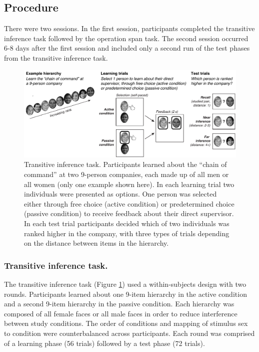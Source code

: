 \documentclass[floatsintext,man]{apa6}
\theoremstyle{definition}
\theoremstyle{definition}
\theoremstyle{definition}
\theoremstyle{remark}
\begin{document}
\subsection{Procedure}\label{procedure}

There were two sessions. In the first session, participants completed
the transitive inference task followed by the operation span task. The
second session occurred 6-8 days after the first session and included
only a second run of the test phases from the transitive inference task.

\begin{figure}
\centering
\includegraphics{figures/design.pdf}
\caption{\label{fig:unnamed-chunk-2}Transitive inference task. Participants
learned about the \enquote{chain of command} at two 9-person companies,
each made up of all men or all women (only one example shown here). In
each learning trial two individuals were presented as options. One
person was selected either through free choice (active condition) or
predetermined choice (passive condition) to receive feedback about their
direct supervisor. In each test trial participants decided which of two
individuals was ranked higher in the company, with three types of trials
depending on the distance between items in the hierarchy. \label{task}}
\end{figure}

\subsubsection{Transitive inference
task.}\label{transitive-inference-task.}

The transitive inference task (Figure \ref{task}) used a within-subjects
design with two rounds. Participants learned about one 9-item hierarchy
in the active condition and a second 9-item hierarchy in the passive
condition. Each hierarchy was composed of all female faces or all male
faces in order to reduce interference between study conditions. The
order of conditions and mapping of stimulus sex to condition were
counterbalanced across participants. Each round was comprised of a
learning phase (56 trials) followed by a test phase (72 trials).
\end{document}
